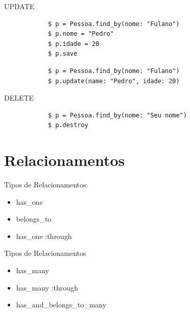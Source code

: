 \documentclass{beamer}
\begin{document}
\begin{frame}[fragile]{UPDATE}
	\begin{block}{}
			\begin{verbatim}			
			$ p = Pessoa.find_by(nome: "Fulano")
			$ p.nome = "Pedro"
			$ p.idade = 20
			$ p.save
			\end{verbatim}
			\end{block}
			\begin{block}{}
			\begin{verbatim}
			$ p = Pessoa.find_by(nome: "Fulano")
			$ p.update(name: "Pedro", idade: 20)
			\end{verbatim}
			\end{block}
\end{frame}

\begin{frame}[fragile]{DELETE }
	\begin{block}{}
			\begin{verbatim}
			$ p = Pessoa.find_by(nome: "Seu nome")
			$ p.destroy
			\end{verbatim}
			\end{block}
\end{frame}

\section{Relacionamentos}
\begin{frame}{Tipos de Relacionamentos}

		\begin{itemize} \itemsep 2em
			\item{\LARGE has\_one}
			\item{\LARGE belongs\_to}
			\item{\LARGE has\_one :through}	
		
		\end{itemize}

\end{frame}
\begin{frame}{Tipos de Relacionamentos}
		\begin{itemize} \itemsep 2em
		    \item{\LARGE has\_many}
		    \item{\LARGE has\_many :through}
	    	\item{\LARGE has\_and\_belongs\_to\_many}
		\end{itemize}
\end{frame}
		  
\end{document}
